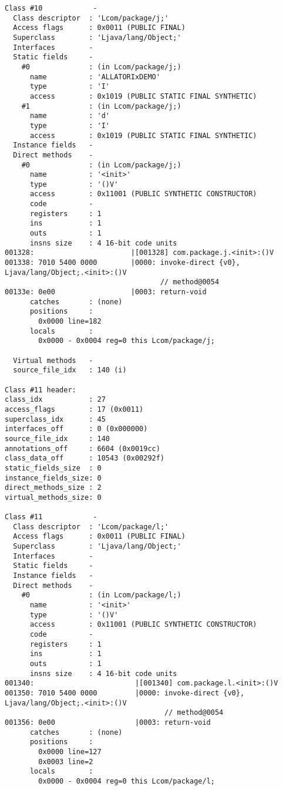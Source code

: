 \begin{lstlisting}
Class #10            -
  Class descriptor  : 'Lcom/package/j;'
  Access flags      : 0x0011 (PUBLIC FINAL)
  Superclass        : 'Ljava/lang/Object;'
  Interfaces        -
  Static fields     -
    #0              : (in Lcom/package/j;)
      name          : 'ALLATORIxDEMO'
      type          : 'I'
      access        : 0x1019 (PUBLIC STATIC FINAL SYNTHETIC)
    #1              : (in Lcom/package/j;)
      name          : 'd'
      type          : 'I'
      access        : 0x1019 (PUBLIC STATIC FINAL SYNTHETIC)
  Instance fields   -
  Direct methods    -
    #0              : (in Lcom/package/j;)
      name          : '<init>'
      type          : '()V'
      access        : 0x11001 (PUBLIC SYNTHETIC CONSTRUCTOR)
      code          -
      registers     : 1
      ins           : 1
      outs          : 1
      insns size    : 4 16-bit code units
001328:                       |[001328] com.package.j.<init>:()V
001338: 7010 5400 0000        |0000: invoke-direct {v0}, Ljava/lang/Object;.<init>:()V
                                     // method@0054
00133e: 0e00                  |0003: return-void
      catches       : (none)
      positions     :
        0x0000 line=182
      locals        :
        0x0000 - 0x0004 reg=0 this Lcom/package/j;

  Virtual methods   -
  source_file_idx   : 140 (i)

Class #11 header:
class_idx           : 27
access_flags        : 17 (0x0011)
superclass_idx      : 45
interfaces_off      : 0 (0x000000)
source_file_idx     : 140
annotations_off     : 6604 (0x0019cc)
class_data_off      : 10543 (0x00292f)
static_fields_size  : 0
instance_fields_size: 0
direct_methods_size : 2
virtual_methods_size: 0

Class #11            -
  Class descriptor  : 'Lcom/package/l;'
  Access flags      : 0x0011 (PUBLIC FINAL)
  Superclass        : 'Ljava/lang/Object;'
  Interfaces        -
  Static fields     -
  Instance fields   -
  Direct methods    -
    #0              : (in Lcom/package/l;)
      name          : '<init>'
      type          : '()V'
      access        : 0x11001 (PUBLIC SYNTHETIC CONSTRUCTOR)
      code          -
      registers     : 1
      ins           : 1
      outs          : 1
      insns size    : 4 16-bit code units
001340:                        |[001340] com.package.l.<init>:()V
001350: 7010 5400 0000         |0000: invoke-direct {v0}, Ljava/lang/Object;.<init>:()V
                                      // method@0054
001356: 0e00                   |0003: return-void
      catches       : (none)
      positions     :
        0x0000 line=127
        0x0003 line=2
      locals        :
        0x0000 - 0x0004 reg=0 this Lcom/package/l;


\end{lstlisting}
